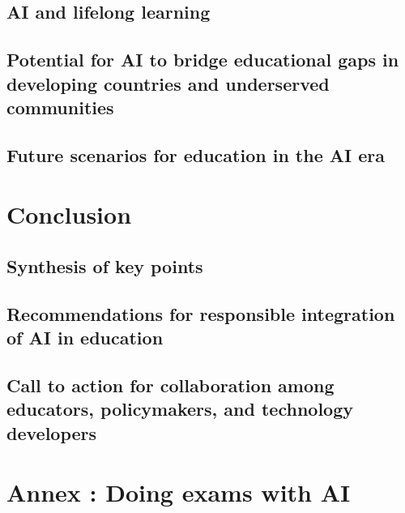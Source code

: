 \documentclass{article}
\begin{document}
\subsection{AI and lifelong learning}
\subsection{Potential for AI to bridge educational gaps in developing countries and underserved communities}
\subsection{Future scenarios for education in the AI era}
\section{Conclusion}
\subsection{Synthesis of key points}
\subsection{Recommendations for responsible integration of AI in education}
\subsection{Call to action for collaboration among educators, policymakers, and technology developers}
\section*{Annex : Doing exams with AI}

\cite{einstein}




\end{document}

